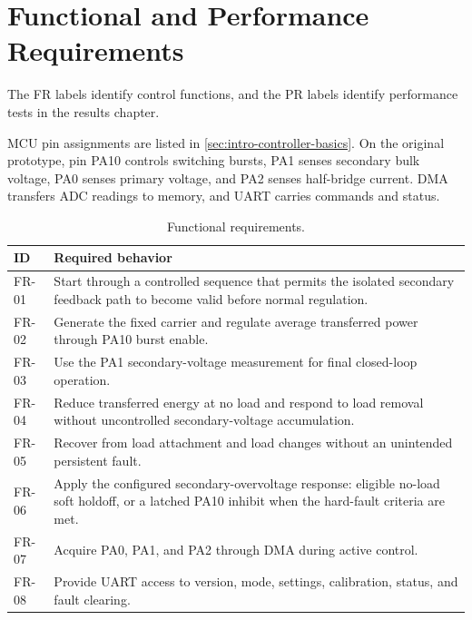 \section{Functional and Performance Requirements}
\label{sec:req-functional}

The FR labels identify control functions, and the PR labels identify performance tests in the results chapter.

MCU pin assignments are listed in \cref{sec:intro-controller-basics}. On the original prototype, pin PA10 controls switching bursts, PA1 senses secondary bulk voltage, PA0 senses primary voltage, and PA2 senses half-bridge current. DMA transfers ADC readings to memory, and UART carries commands and status.

\begin{table}[H]
\centering
\caption{Functional requirements.}
\label{tab:req-functional}
\begin{tabularx}{\textwidth}{@{}L{0.12\textwidth}Y@{}}
\toprule
ID & Required behavior\\
\midrule
FR-01 & Start through a controlled sequence that permits the isolated secondary feedback path to become valid before normal regulation.\\
FR-02 & Generate the fixed carrier and regulate average transferred power through PA10 burst enable.\\
FR-03 & Use the PA1 secondary-voltage measurement for final closed-loop operation.\\
FR-04 & Reduce transferred energy at no load and respond to load removal without uncontrolled secondary-voltage accumulation.\\
FR-05 & Recover from load attachment and load changes without an unintended persistent fault.\\
FR-06 & Apply the configured secondary-overvoltage response: eligible no-load soft holdoff, or a latched PA10 inhibit when the hard-fault criteria are met.\\
FR-07 & Acquire PA0, PA1, and PA2 through DMA during active control.\\
FR-08 & Provide UART access to version, mode, settings, calibration, status, and fault clearing.\\
\bottomrule
\end{tabularx}
\end{table}

